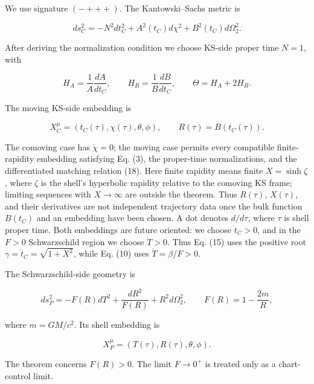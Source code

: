 \documentclass[pdflatex,sn-mathphys-num]{sn-jnl}
\begin{document}
We use signature \((-+++)\). The Kantowski--Sachs metric is


\begin{equation}
ds_C^2=-N^2dt_C^2+A^2(t_C)d\chi^2+B^2(t_C)d\Omega_2^2.
\tag{1}
\end{equation}

After deriving the normalization condition we choose KS-side proper time \(N=1\), with


\begin{equation}
H_A=\frac{1}{A}\frac{dA}{dt_C},
\qquad
H_B=\frac{1}{B}\frac{dB}{dt_C},
\qquad
\Theta=H_A+2H_B.
\tag{2}
\end{equation}

The moving KS-side embedding is


\begin{equation}
X_C^\mu=(t_C(\tau),\chi(\tau),\theta,\phi),
\qquad
R(\tau)=B(t_C(\tau)).
\tag{3}
\end{equation}

The comoving case has \(\dot\chi=0\); the moving case permits every compatible finite-rapidity embedding satisfying Eq. (3), the proper-time normalizations, and the differentiated matching relation (18). Here finite rapidity means finite \(X=\sinh\zeta\), where \(\zeta\) is the shell's hyperbolic rapidity relative to the comoving KS frame; limiting sequences with \(X\to\infty\) are outside the theorem. Thus \(R(\tau)\), \(X(\tau)\), and their derivatives are not independent trajectory data once the bulk function \(B(t_C)\) and an embedding have been chosen. A dot denotes \(d/d\tau\), where \(\tau\) is shell proper time. Both embeddings are future oriented: we choose \(\dot t_C>0\), and in the \(F>0\) Schwarzschild region we choose \(\dot T>0\). Thus Eq. (15) uses the positive root \(\gamma=\dot t_C=\sqrt{1+X^2}\), while Eq. (10) uses \(\dot T=\beta/F>0\).


The Schwarzschild-side geometry is


\begin{equation}
ds_P^2=-F(R)dT^2+\frac{dR^2}{F(R)}+R^2d\Omega_2^2,
\qquad
F(R)=1-\frac{2m}{R},
\tag{4}
\end{equation}

where \(m=GM/c^2\). Its shell embedding is


\begin{equation}
X_P^\mu=(T(\tau),R(\tau),\theta,\phi).
\tag{5}
\end{equation}

The theorem concerns \(F(R)>0\). The limit \(F\to0^+\) is treated only as a chart-control limit.
\end{document}
